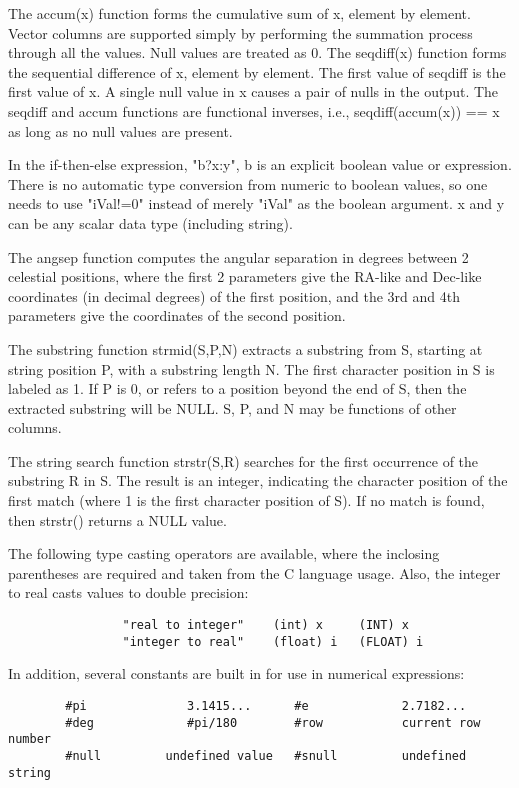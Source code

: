\documentclass[11pt]{book}
\begin{document}
The accum(x) function forms the cumulative sum of x, element by element.
Vector columns are supported simply by performing the summation process
through all the values.  Null values are treated as 0.  The seqdiff(x)
function forms the sequential difference of x, element by element.
The first value of seqdiff is the first value of x.  A single null
value in x causes a pair of nulls in the output.  The seqdiff and
accum functions are functional inverses, i.e., seqdiff(accum(x)) == x
as long as no null values are present.

In the if-then-else expression, "b?x:y", b is an explicit boolean
value or expression.  There is no automatic type conversion from
numeric to boolean values, so one needs to use "iVal!=0" instead of
merely "iVal" as the boolean argument. x and y can be any scalar data
type (including string).

The angsep function computes the angular separation in degrees
between 2 celestial positions, where the first 2 parameters
give the RA-like and Dec-like coordinates (in decimal degrees)
of the first position, and the 3rd and 4th parameters give the
coordinates of the second position.

The substring function strmid(S,P,N) extracts a substring from S,
starting at string position P, with a substring length N.  The first
character position in S is labeled as 1. If P is 0, or refers to a
position beyond the end of S, then the extracted substring will be
NULL.  S, P, and N may be functions of other columns.

The string search function strstr(S,R) searches for the first occurrence
of the substring R in S.  The result is an integer, indicating the
character position of the first match (where 1 is the first character
position of S).  If no match is found, then strstr() returns a NULL
value.

The  following  type  casting  operators  are  available,  where the
inclosing parentheses are required and taken  from  the  C  language
usage. Also, the integer to real casts values to double precision:

\begin{verbatim}
                "real to integer"    (int) x     (INT) x
                "integer to real"    (float) i   (FLOAT) i
\end{verbatim}

    In addition, several constants are built in  for  use  in  numerical
    expressions:


\begin{verbatim}
        #pi              3.1415...      #e             2.7182...
        #deg             #pi/180        #row           current row number
        #null         undefined value   #snull         undefined string
\end{verbatim}
\end{document}

